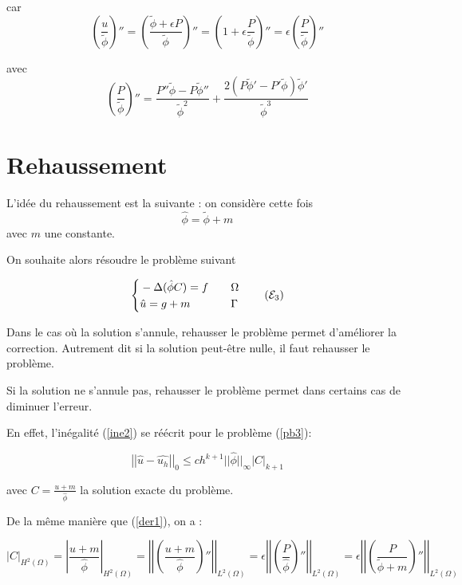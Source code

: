 car
$$\left(\frac{u}{\tilde{\phi}}\right)''=\left(\frac{\tilde{\phi}+\epsilon P}{\tilde{\phi}}\right)''=\left(1+\epsilon\frac{P}{\tilde{\phi}}\right)''=\epsilon\left(\frac{P}{\tilde{\phi}}\right)''$$

avec
$$\left(\frac{P}{\tilde{\phi}}\right)''=\frac{P''\tilde{\phi}-P\tilde{\phi}''}{\tilde{\phi}^2}+\frac{2(P\tilde{\phi}'-P'\tilde{\phi})\tilde{\phi}'}{\tilde{\phi}^3}$$

\section*{Rehaussement}

L'idée du rehaussement est la suivante : on considère cette fois
$$\hat{\phi}=\tilde{\phi}+m$$
avec $m$ une constante.

On souhaite alors résoudre le problème suivant

\begin{equation}
	\left\{\begin{aligned}
		&-\Delta (\hat{\phi}C)=f \quad &&\Omega \\
		&\hat{u}=g+m \quad &&\Gamma
	\end{aligned}\right. \label{pb3} \tag{$\mathcal{E}_3$}
\end{equation}

Dans le cas où la solution s'annule, rehausser le problème permet d'améliorer la correction. Autrement dit si la solution peut-être nulle, il faut rehausser le problème.

Si la solution ne s'annule pas, rehausser le problème permet dans certains cas de diminuer l'erreur.

En effet, l'inégalité (\ref{ine2}) se réécrit pour le problème (\ref{pb3}):

\begin{equation}
	\left|\left|\hat{u}-\hat{u_h}\right|\right|_0\le ch^{k+1}||\hat{\phi}||_\infty\left|C\right|_{k+1}
	\label{ine3}
\end{equation}

avec $C=\frac{u+m}{\hat{\phi}}$ la solution exacte du problème.

De la même manière que (\ref{der1}), on a :

\begin{equation}
	|C|_{H^2(\Omega)}=\left|\frac{u+m}{\hat{\phi}}\right|_{H^2(\Omega)}=\left|\left|\left(\frac{u+m}{\hat{\phi}}\right)''\right|\right|_{L^2(\Omega)}=\epsilon\left|\left|\left(\frac{P}{\hat{\phi}}\right)''\right|\right|_{L^2(\Omega)}=\epsilon\left|\left|\left(\frac{P}{\tilde{\phi}+m}\right)''\right|\right|_{L^2(\Omega)} \label{der2}
\end{equation}


